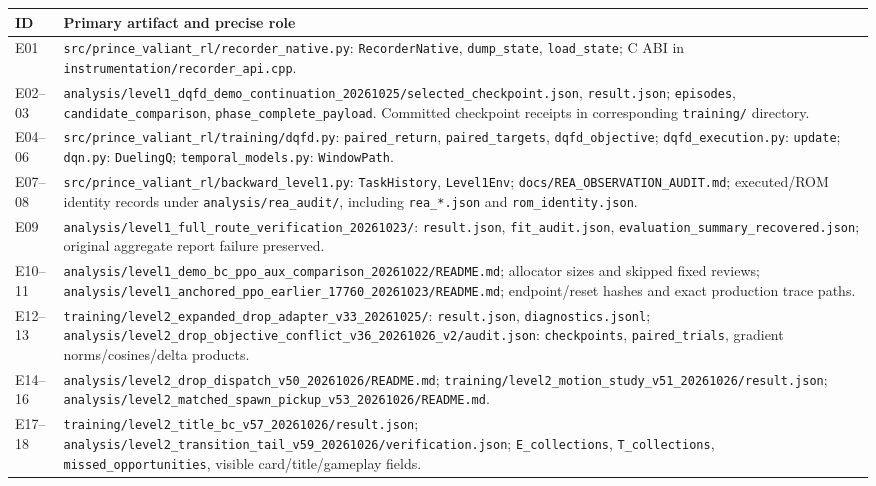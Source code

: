\documentclass[11pt,a4paper]{article}
\newcommand{\pathref}[1]{\nolinkurl{#1}}
\begin{document}
\begin{tabularx}{\linewidth}{@{}P{15mm}Y@{}}\toprule
ID & Primary artifact and precise role\\\midrule
E01 & \pathref{src/prince_valiant_rl/recorder_native.py}: \texttt{RecorderNative}, \texttt{dump\_state}, \texttt{load\_state}; C ABI in \pathref{instrumentation/recorder_api.cpp}.\\
E02--03 & \pathref{analysis/level1_dqfd_demo_continuation_20261025/selected_checkpoint.json}, \texttt{result.json}; \texttt{episodes}, \texttt{candidate\_comparison}, \texttt{phase\_complete\_payload}. Committed checkpoint receipts in corresponding \pathref{training/} directory.\\
E04--06 & \pathref{src/prince_valiant_rl/training/dqfd.py}: \texttt{paired\_return}, \texttt{paired\_targets}, \texttt{dqfd\_objective}; \texttt{dqfd\_execution.py}: \texttt{update}; \texttt{dqn.py}: \texttt{DuelingQ}; \texttt{temporal\_models.py}: \texttt{WindowPath}.\\
E07--08 & \pathref{src/prince_valiant_rl/backward_level1.py}: \texttt{TaskHistory}, \texttt{Level1Env}; \pathref{docs/REA_OBSERVATION_AUDIT.md}; executed/ROM identity records under \pathref{analysis/rea_audit/}, including \texttt{rea\_*.json} and \texttt{rom\_identity.json}.\\
E09 & \pathref{analysis/level1_full_route_verification_20261023/}: \texttt{result.json}, \texttt{fit\_audit.json}, \texttt{evaluation\_summary\_recovered.json}; original aggregate report failure preserved.\\
E10--11 & \pathref{analysis/level1_demo_bc_ppo_aux_comparison_20261022/README.md}; allocator sizes and skipped fixed reviews; \pathref{analysis/level1_anchored_ppo_earlier_17760_20261023/README.md}; endpoint/reset hashes and exact production trace paths.\\
E12--13 & \pathref{training/level2_expanded_drop_adapter_v33_20261025/}: \texttt{result.json}, \texttt{diagnostics.jsonl}; \pathref{analysis/level2_drop_objective_conflict_v36_20261026_v2/audit.json}: \texttt{checkpoints}, \texttt{paired\_trials}, gradient norms/cosines/delta products.\\
E14--16 & \pathref{analysis/level2_drop_dispatch_v50_20261026/README.md}; \pathref{training/level2_motion_study_v51_20261026/result.json}; \pathref{analysis/level2_matched_spawn_pickup_v53_20261026/README.md}.\\
E17--18 & \pathref{training/level2_title_bc_v57_20261026/result.json}; \pathref{analysis/level2_transition_tail_v59_20261026/verification.json}; \texttt{E\_collections}, \texttt{T\_collections}, \texttt{missed\_opportunities}, visible card/title/gameplay fields.\\

\end{tabularx}
\end{document}
